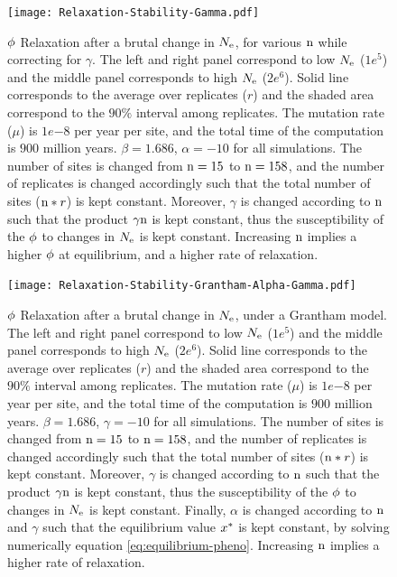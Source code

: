\begin{figure}[H]
	\centering
	\texttt{[image: Relaxation-Stability-Gamma.pdf]}
	\caption[Relaxation time of $\avgpfix$ dependence on $\Nsites$, while correction for $\gamma$]{
	$\avgpfix$ Relaxation after a brutal change in $N_{\mathrm{e}}$, for various $\Nsites$ while correcting for $\gamma$.
	The left and right panel correspond to low $N_{\mathrm{e}}$ ($1e^{5}$) and the middle panel corresponds to high $N_{\mathrm{e}}$ ($2e^{6}$).
	Solid line corresponds to the average over replicates ($r$) and the shaded area correspond to the $90\%$ interval among replicates.
	The mutation rate ($\mu$) is $1e{-8}$ per year per site, and the total time of the computation is $900$ million years.
	$\beta=1.686$, $\alpha=-10$ for all simulations. The number of sites is changed from $\text{n}=15$ to $\text{n}=158$, and the number of replicates is changed accordingly such that the total number of sites ($\text{n}*r$) is kept constant.
	Moreover, $\gamma$ is changed according to $\text{n}$ such that the product $\gamma\text{n}$ is kept constant, thus the  susceptibility of the $\avgpfix$ to changes in $N_{\mathrm{e}}$ is kept constant.
	Increasing $\text{n}$ implies a higher $\avgpfix$ at equilibrium, and a higher rate of relaxation.
	}
\end{figure}

\begin{figure}[H]
	\centering
	\texttt{[image: Relaxation-Stability-Grantham-Alpha-Gamma.pdf]}
	\caption[Relaxation time of $\avgpfix$ for the Grantham model]{
	$\avgpfix$ Relaxation after a brutal change in $N_{\mathrm{e}}$, under a Grantham model.
	The left and right panel correspond to low $N_{\mathrm{e}}$ ($1e^{5}$) and the middle panel corresponds to high $N_{\mathrm{e}}$ ($2e^{6}$).
	Solid line corresponds to the average over replicates ($r$) and the shaded area correspond to the $90\%$ interval among replicates.
	The mutation rate ($\mu$) is $1e{-8}$ per year per site, and the total time of the computation is $900$ million years.
	$\beta=1.686$, $\gamma=-10$ for all simulations. The number of sites is changed from $\text{n}=15$ to $\text{n}=158$, and the number of replicates is changed accordingly such that the total number of sites ($\text{n}*r$) is kept constant.
	Moreover, $\gamma$ is changed according to $\text{n}$ such that the product $\gamma\text{n}$ is kept constant, thus the  susceptibility of the $\avgpfix$ to changes in $N_{\mathrm{e}}$ is kept constant.
	Finally, $\alpha$ is changed according to $\text{n}$ and $\gamma$ such that the equilibrium value $x^{*}$ is kept constant, by solving numerically equation \ref{eq:equilibrium-pheno}.
	Increasing $\text{n}$ implies a higher rate of relaxation.}
\end{figure}

